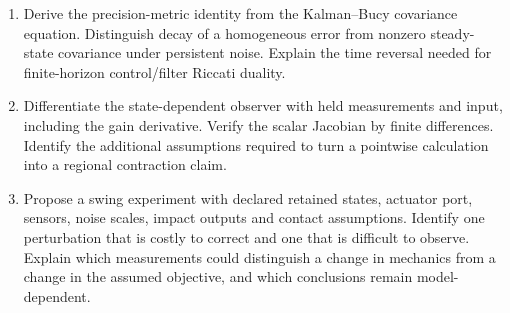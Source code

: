 \begin{enumerate}
\item Derive the precision-metric identity from the Kalman--Bucy covariance equation. Distinguish decay of a homogeneous error from nonzero steady-state covariance under persistent noise. Explain the time reversal needed for finite-horizon control/filter Riccati duality.

\item Differentiate the state-dependent observer with held measurements and input, including the gain derivative. Verify the scalar Jacobian by finite differences. Identify the additional assumptions required to turn a pointwise calculation into a regional contraction claim.

\item Propose a swing experiment with declared retained states, actuator port, sensors, noise scales, impact outputs and contact assumptions. Identify one perturbation that is costly to correct and one that is difficult to observe. Explain which measurements could distinguish a change in mechanics from a change in the assumed objective, and which conclusions remain model-dependent.
\end{enumerate}
